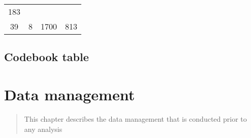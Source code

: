 \documentclass[]{book}
\begin{document}
\begin{longtable}[]{@{}cccc@{}}
\begin{minipage}[t]{0.10\columnwidth}
183\strut
\end{minipage}\tabularnewline
\begin{minipage}[t]{0.28\columnwidth}\centering\strut
39\strut
\end{minipage} & \begin{minipage}[t]{0.18\columnwidth}\centering\strut
8\strut
\end{minipage} & \begin{minipage}[t]{0.14\columnwidth}\centering\strut
1700\strut
\end{minipage} & \begin{minipage}[t]{0.10\columnwidth}\centering\strut
813\strut
\end{minipage}\tabularnewline
\bottomrule
\end{longtable}

\section{Codebook table}\label{codebook-table-1}

\hypertarget{htmlwidget-15c6157bb50473b6db73}{}

\chapter{Data management}\label{data-management-1}

\begin{quote}
This chapter describes the data management that is conducted prior to
any analysis
\end{quote}
\end{document}

